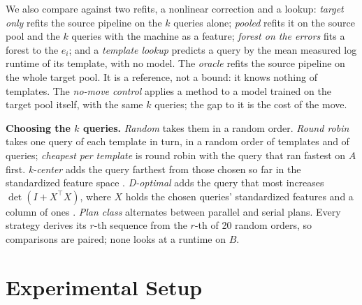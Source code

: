 \documentclass[sigconf,review]{acmart}
\newcommand{\inputif}[1]{\IfFileExists{#1}{}{}}
\begin{document}
We also compare against two refits, a nonlinear correction and a lookup:
\emph{target only} refits the source pipeline on the $k$ queries alone;
\emph{pooled} refits it on the source pool and the $k$ queries with the
machine as a feature; \emph{forest on the errors} fits a forest to the
$e_i$; and a \emph{template lookup} predicts a query by the mean measured
log runtime of its template, with no model. The \emph{oracle} refits the
source pipeline on the whole target pool. It is a reference, not a bound:
it knows nothing of templates. The \emph{no-move control} applies a method
to a model trained on the target pool itself, with the same $k$ queries;
the gap to it is the cost of the move.

\textbf{Choosing the $k$ queries.} \emph{Random} takes them in a random
order. \emph{Round robin} takes one query of each template in turn, in a
random order of templates and of queries; \emph{cheapest per template} is
round robin with the query that ran fastest on $A$ first. \emph{k-center}
adds the query farthest from those chosen so far in the standardized
feature space \cite{gonzalez1985,sener2018}. \emph{D-optimal} adds the
query that most increases $\det(I + X^\top X)$, where $X$ holds the chosen
queries' standardized features and a column of ones
\cite{wynn1970,mitchell1974}. \emph{Plan class} alternates between parallel
and serial plans. Every strategy derives its $r$-th sequence from the
$r$-th of 20 random orders, so comparisons are paired; none looks at a
runtime on $B$.

\section{Experimental Setup}
\label{sec:setup}

\begin{table}[t]
\caption{How the runtime of the same plan changes, for seven of the 30 ordered pairs of each workload. Slowdown: median of target over source runtime, for serial plans and plans with parallel workers. Template share: the share of the variance of the log slowdown between templates (shift), the same corrected for the number of templates ($\epsilon^2$), and the share between two passes on the source alone (noise). $R^2$: least-squares fits of the log slowdown on whether the plan is parallel, on the log source runtime (size) and on both with their interaction; features (new): a ridge model on the 19 features scored on templates (TPC-DS: families) left out of its fit, which can be negative.}
\label{tab:shift}
\small
\inputif{../results/paper/final/table_shift_paper.tex}
\end{table}
\end{document}

